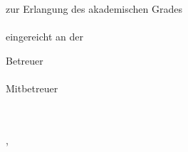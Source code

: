 
\begin{titlepage}


%

\begin{center}
~
\vfill\vfill\vfill

\sffamily

\myauthor

\vfill

{\LARGE\bfseries\mytitle}

{\large\bfseries\mysubtitle}

\vfill\vfill\vfill\vfill

{\normalsize\bfseries\myworktitle}\\
\vfill
zur Erlangung des akademischen Grades\\
{\mygrade}\\
\vfill
eingereicht an der\\
{\normalsize\bfseries\myuniversity}

\vfill\vfill\vfill
\vfill\vfill\vfill

Betreuer\\
\mysupervisor\\
\vfill
Mitbetreuer\\
\mycosupervisor\\
\vfill
\vfill
\myinstitute\\

\vfill

\myfaculty

\vfill\vfill\vfill

{\scriptsize\mysubmissiontown, \mysubmissionmonth~\mysubmissionyear}

\end{center}
\end{titlepage}

